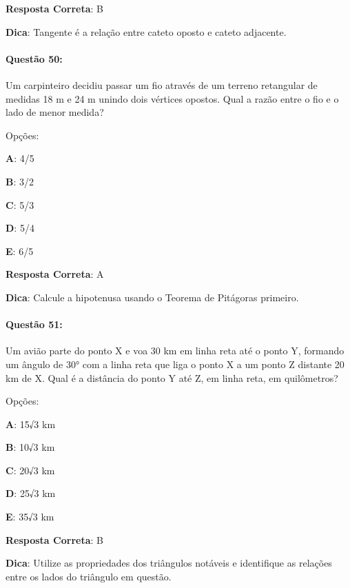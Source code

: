 \documentclass{article}
\begin{document}
\vspace{\baselineskip}\textbf{Resposta Correta}: B

\vspace{\baselineskip}\textbf{Dica}: Tangente é a relação entre cateto oposto e cateto adjacente.

\paragraph{Questão 50:}
{Um carpinteiro decidiu passar um fio através de um terreno retangular de medidas 18 m e 24 m unindo dois vértices opostos. Qual a razão entre o fio e o lado de menor medida?}

\vspace{\baselineskip}Opções:

\vspace{\baselineskip}\textbf{A}: 4/5 

\textbf{B}: 3/2 

\textbf{C}: 5/3 

\textbf{D}: 5/4 

\textbf{E}: 6/5 

\vspace{\baselineskip}\textbf{Resposta Correta}: A

\vspace{\baselineskip}\textbf{Dica}: Calcule a hipotenusa usando o Teorema de Pitágoras primeiro.

\paragraph{Questão 51:}
{Um avião parte do ponto X e voa 30 km em linha reta até o ponto Y, formando um ângulo de 30° com a linha reta que liga o ponto X a um ponto Z distante 20 km de X. Qual é a distância do ponto Y até Z, em linha reta, em quilômetros?}

\vspace{\baselineskip}Opções:

\vspace{\baselineskip}\textbf{A}: 15√3 km 

\textbf{B}: 10√3 km 

\textbf{C}: 20√3 km 

\textbf{D}: 25√3 km 

\textbf{E}: 35√3 km 

\vspace{\baselineskip}\textbf{Resposta Correta}: B

\vspace{\baselineskip}\textbf{Dica}: Utilize as propriedades dos triângulos notáveis e identifique as relações entre os lados do triângulo em questão.
\end{document}
